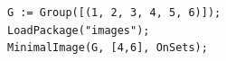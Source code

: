 \begin{verbatim}
G := Group([(1, 2, 3, 4, 5, 6)]);
LoadPackage("images");
MinimalImage(G, [4,6], OnSets);
\end{verbatim}
